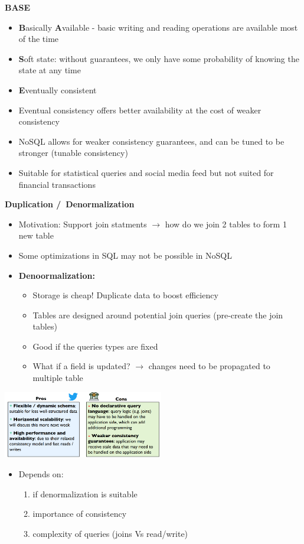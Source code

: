 \documentclass[10pt, landscape]{article}
\begin{document}
\begin{multicols}{4}
\textbf{BASE}
\begin{itemize}
  \item \textbf{B}asically \textbf{A}vailable - basic writing and reading operations are available most of the time 
  \item \textbf{S}oft state: without guarantees, we only have some probability of knowing the state at any time 
  \item \textbf{E}ventually consistent
  \item Eventual consistency offers better availability at the cost of weaker consistency 
  \item NoSQL allows for weaker consistency guarantees, and can be tuned to be stronger (tunable consistency)
  \item Suitable for statistical queries and social media feed but not suited for financial transactions 
\end{itemize}

\textbf{Duplication /\ Denormalization}
\begin{itemize}
  \item Motivation: Support join statments $\rightarrow$ how do we join 2 tables to form 1 new table 
  \item Some optimizations in SQL may not be possible in NoSQL
  \item \textbf{Denoormalization: } 
  \begin{itemize}
    \item Storage is cheap! Duplicate data to boost efficiency
    \item Tables are designed around potential join queries (pre-create the join tables)
    \item Good if the queries types are fixed 
    \item What if a field is updated? $\rightarrow$ changes need to be propagated to multiple table 
  \end{itemize}
\end{itemize}

\includegraphics*[width=7cm]{nosql_pros_cons}
\begin{itemize}
  \item Depends on: 
  \begin{enumerate}
    \item if denormalization is suitable
    \item importance of consistency 
    \item complexity of queries (joins Vs read/write)
  \end{enumerate}
\end{itemize}


\end{multicols}
\end{document}
